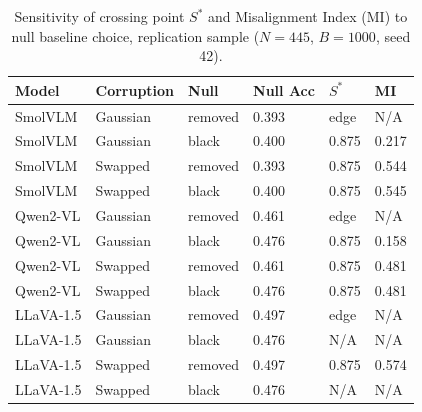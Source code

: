 \begin{table}[t]
\centering
\caption{Sensitivity of crossing point $S^*$ and Misalignment Index (MI)
  to null baseline choice, replication sample ($N=445$, $B=1000$, seed 42).}
\label{tab:vlm-rep-null-sensitivity}
{\footnotesize\setlength{\tabcolsep}{3pt}%
\begin{tabular}{llllll}
\toprule
\textbf{Model} & \textbf{Corruption} & Null & Null Acc & $S^*$ & MI \\
\midrule
SmolVLM   & Gaussian & removed & 0.393 & edge  & N/A \\
SmolVLM   & Gaussian & black   & 0.400 & 0.875 & 0.217 \\
SmolVLM   & Swapped  & removed & 0.393 & 0.875 & 0.544 \\
SmolVLM   & Swapped  & black   & 0.400 & 0.875 & 0.545 \\
Qwen2-VL  & Gaussian & removed & 0.461 & edge  & N/A \\
Qwen2-VL  & Gaussian & black   & 0.476 & 0.875 & 0.158 \\
Qwen2-VL  & Swapped  & removed & 0.461 & 0.875 & 0.481 \\
Qwen2-VL  & Swapped  & black   & 0.476 & 0.875 & 0.481 \\
LLaVA-1.5 & Gaussian & removed & 0.497 & edge  & N/A \\
LLaVA-1.5 & Gaussian & black   & 0.476 & N/A   & N/A \\
LLaVA-1.5 & Swapped  & removed & 0.497 & 0.875 & 0.574 \\
LLaVA-1.5 & Swapped  & black   & 0.476 & N/A   & N/A \\
\bottomrule
\end{tabular}}
\end{table}
